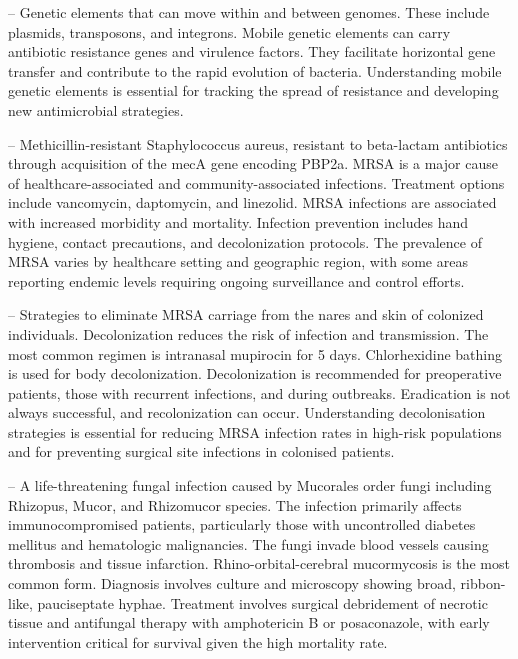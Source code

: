 -- Genetic elements that can move within and between genomes. These include plasmids, transposons, and integrons. Mobile genetic elements can carry antibiotic resistance genes and virulence factors. They facilitate horizontal gene transfer and contribute to the rapid evolution of bacteria. Understanding mobile genetic elements is essential for tracking the spread of resistance and developing new antimicrobial strategies.

-- Methicillin-resistant Staphylococcus aureus, resistant to beta-lactam antibiotics through acquisition of the mecA gene encoding PBP2a. MRSA is a major cause of healthcare-associated and community-associated infections. Treatment options include vancomycin, daptomycin, and linezolid. MRSA infections are associated with increased morbidity and mortality. Infection prevention includes hand hygiene, contact precautions, and decolonization protocols. The prevalence of MRSA varies by healthcare setting and geographic region, with some areas reporting endemic levels requiring ongoing surveillance and control efforts.

-- Strategies to eliminate MRSA carriage from the nares and skin of colonized individuals. Decolonization reduces the risk of infection and transmission. The most common regimen is intranasal mupirocin for 5 days. Chlorhexidine bathing is used for body decolonization. Decolonization is recommended for preoperative patients, those with recurrent infections, and during outbreaks. Eradication is not always successful, and recolonization can occur. Understanding decolonisation strategies is essential for reducing MRSA infection rates in high-risk populations and for preventing surgical site infections in colonised patients.

-- A life-threatening fungal infection caused by Mucorales order fungi including Rhizopus, Mucor, and Rhizomucor species. The infection primarily affects immunocompromised patients, particularly those with uncontrolled diabetes mellitus and hematologic malignancies. The fungi invade blood vessels causing thrombosis and tissue infarction. Rhino-orbital-cerebral mucormycosis is the most common form. Diagnosis involves culture and microscopy showing broad, ribbon-like, pauciseptate hyphae. Treatment involves surgical debridement of necrotic tissue and antifungal therapy with amphotericin B or posaconazole, with early intervention critical for survival given the high mortality rate.

